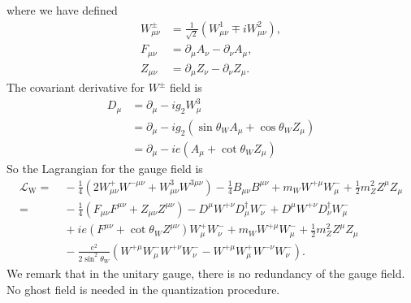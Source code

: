\documentclass[aps,prb,superscriptaddress,nofootinbib]{revtex4}
\begin{document}
where we have defined 
\begin{equation}
\begin{aligned}
	W^\pm_{\mu\nu} &= \frac{1}{\sqrt 2} (W^1_{\mu\nu} \mp i W^2_{\mu\nu}), \\
	F_{\mu\nu} &= \partial_\mu A_\nu - \partial_\nu A_\mu, \\
	Z_{\mu\nu} &= \partial_\mu Z_\nu - \partial_\nu Z_\mu.
\end{aligned}
\end{equation}
The covariant derivative for $W^\pm$ field is
\begin{equation}
\begin{aligned}
	D_\mu &= \partial_\mu -i g_2 W^3_\mu \\
	&= \partial_\mu -i g_2 \left(\sin{\theta_W}A_\mu + \cos{\theta_W} Z_\mu \right) \\
	&= \partial_\mu -i e \left(A_\mu + \cot{\theta_W} Z_\mu \right)
\end{aligned}
\end{equation}
So the Lagrangian for the gauge field is
\begin{equation}
\begin{aligned}
	\mathcal L_\mathrm{W}
	=&\ -\frac{1}{4}(2W_{\mu\nu}^+ W^{-\mu\nu} + W_{\mu\nu}^3 W^{3\mu\nu}) -\frac{1}{4} B_{\mu\nu}B^{\mu\nu} + m_W W^{+\mu} W_\mu^- + \frac{1}{2}m_Z^2 Z^\mu Z_\mu \\
	=&\ -\frac{1}{4}(F_{\mu\nu}F^{\mu\nu} + Z_{\mu\nu} Z^{\mu\nu}) - D^{\mu} W^{+\nu} D^\dagger_\mu W_\nu^- + D^\mu W^{+\nu} D^\dagger_\nu W^-_\mu \\
	&\ +ie (F^{\mu\nu} + \cot{\theta_W} Z^{\mu\nu})W_\mu^+ W_\nu^- + m_W W^{+\mu} W_\mu^- + \frac{1}{2}m_Z^2 Z^\mu Z_\mu \\
	&\ -\frac{e^2}{2\sin^2{\theta_W}} \left(W^{+\mu}W^-_\mu W^{+\nu}W^-_\nu - W^{+\mu}W^+_\mu W^{-\nu}W^-_\nu \right).
\end{aligned}
\end{equation}
We remark that in the unitary gauge, there is no redundancy of the gauge field.
No ghost field is needed in the quantization procedure.
\end{document}
